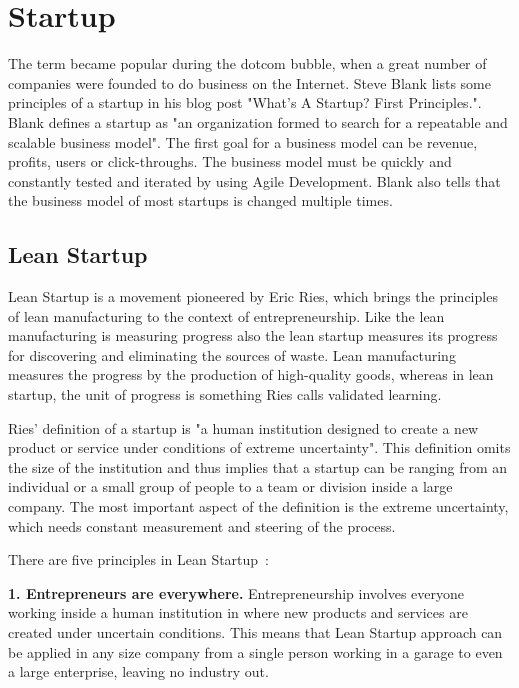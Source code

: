 
 \section{Startup}
\label{sec:startup}

The term became popular during the dotcom bubble, when a great number of companies were founded to do business on the Internet. Steve Blank lists some principles of a startup in his blog post "What’s A Startup? First Principles.". Blank defines a startup as "an organization formed to search for a repeatable and scalable business model". The first goal for a business model can be revenue, profits, users or click-throughs. The business model must be quickly and constantly tested and iterated by using Agile Development. Blank also tells that the business model of most startups is changed multiple times.~\cite{blank2010startup}

 \subsection{Lean Startup}
 
Lean Startup is a movement pioneered by Eric Ries, which brings the principles of lean manufacturing to the context of entrepreneurship. Like the lean manufacturing is measuring progress also the lean startup measures its progress for discovering and eliminating the sources of waste. Lean manufacturing measures the progress by the production of high-quality goods, whereas in lean startup, the unit of progress is something Ries calls validated learning.~\cite{ries2011lean}

Ries' definition of a startup is "a human institution designed to create a new product or service under conditions of extreme uncertainty". This definition omits the size of the institution and thus implies that a startup can be ranging from an individual or a small group of people to a team or division inside a large company. The most important aspect of the definition is the extreme uncertainty, which needs constant measurement and steering of the process.

There are five principles in Lean Startup~\cite{ries2011lean}:


\textbf{1. Entrepreneurs are everywhere.} Entrepreneurship involves everyone working inside a human institution in where new products and services are created under uncertain conditions. This means that Lean Startup approach can be applied in any size company from a single person working in a garage to even a large enterprise, leaving no industry out.

